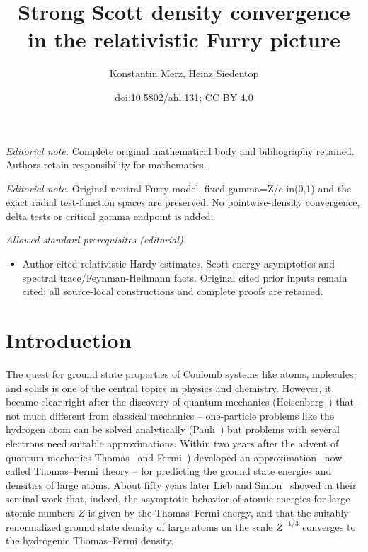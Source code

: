 \documentclass[10pt]{amsart}
\title{Strong Scott density convergence in the relativistic Furry picture}
\author{Konstantin Merz, Heinz Siedentop}
\date{doi:10.5802/ahl.131; CC BY 4.0}
\theoremstyle{definition}
\begin{document}
\maketitle
\noindent\textit{Editorial note.} Complete original mathematical body and bibliography retained. Authors retain responsibility for mathematics.\par\medskip
\noindent\textit{Editorial note.} Original neutral Furry model, fixed gamma=Z/c in(0,1) and the exact radial test-function spaces are preserved. No pointwise-density convergence, delta tests or critical gamma endpoint is added.\par\medskip
\noindent\textit{Allowed standard prerequisites (editorial).}\begin{itemize}
\item Author-cited relativistic Hardy estimates, Scott energy asymptotics and spectral trace/Feynman-Hellmann facts. Original cited prior inputs remain cited; all source-local constructions and complete proofs are retained.
\end{itemize}\medskip
\section{Introduction}
The quest for ground state properties of Coulomb systems like atoms, molecules, and solids is one of the central topics in physics and chemistry. However, it became clear right after the discovery of quantum mechanics (Heisenberg~\cite{Heisenberg1925}) that -- not much different from classical mechanics -- one-particle problems like the hydrogen atom can be solved analytically (Pauli~\cite{Pauli1926}) but problems with several electrons need suitable approximations. Within two years after the advent of quantum mechanics Thomas~\cite{Thomas1927} and Fermi~\cite{Fermi1927,Fermi1928}) developed an approximation-- now called Thomas--Fermi theory -- for predicting the ground state energies and densities of large atoms. About fifty years later Lieb and Simon~\cite{LiebSimon1977} showed in their seminal work that, indeed, the asymptotic behavior of atomic energies for large atomic numbers $Z$ is given by the Thomas--Fermi energy, and that the suitably renormalized ground state density of large atoms on the scale $Z^{-1/3}$ converges to the hydrogenic Thomas--Fermi density.
\end{document}
